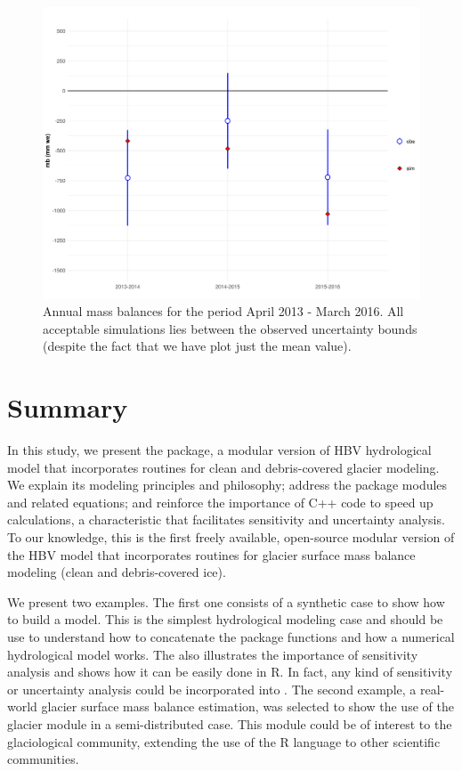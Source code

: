 \begin{figure}[htbp]
  \centering
  \includegraphics[scale = 0.5]{alerce_mass_balance}
  \caption{Annual mass balances for the period April 2013 - March 2016. All acceptable simulations lies between the 
  observed uncertainty bounds (despite the fact that we have plot just the mean value).}
  \label{fig:alerce_mb}
\end{figure}

\section{Summary}

In this study, we present the  package, a modular version of HBV hydrological model that incorporates routines
for clean and debris-covered glacier modeling. We explain its modeling principles and philosophy; address the package modules and
related equations; and reinforce the importance of C++ code to speed up calculations, a characteristic that facilitates 
sensitivity and uncertainty analysis. To our knowledge, this is the first freely available, open-source modular version of the 
HBV model that incorporates routines for glacier surface mass balance modeling (clean and debris-covered ice).

We present two examples. The first one consists of a synthetic case to show how to build a model. This is the simplest
hydrological modeling case and should be use to understand how to concatenate the package functions and how a numerical
hydrological model works. The  also illustrates the importance of sensitivity analysis and 
shows how it can be easily done in R. In fact, any kind of sensitivity or uncertainty analysis \citep{pianosi:2016} could be
incorporated into .
The second example, a real-world glacier surface mass balance estimation, was selected to show the use of the glacier module in
a semi-distributed case. This module could be of interest to the glaciological community, extending the use of the R language to
other scientific communities.

